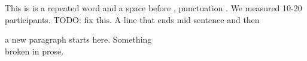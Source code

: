 \documentclass{article}
\begin{document}
This is is a repeated word and a space before , punctuation .
We measured 10-20 participants. TODO: fix this.
A line that ends mid sentence and then

a new paragraph starts here.
Something\\ broken in prose.
\end{document}
